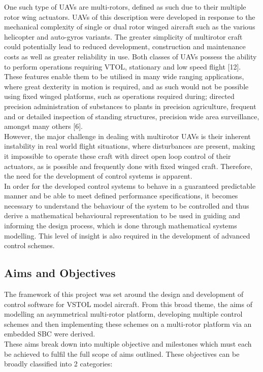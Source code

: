 \documentclass[12pt,a4paper,twoside]{report}
\begin{document}
			One such type of UAVs are multi-rotors, defined as such due to their multiple rotor wing actuators. UAVs of this description were developed in response to the mechanical complexity of single or dual rotor winged aircraft such as the various helicopter and auto-gyros variants. The greater simplicity of multirotor craft could potentially lead to reduced development, construction and maintenance costs as well as greater reliability in use. Both classes of UAVs possess the ability to perform operations requiring VTOL, stationary and low speed flight [12].
			\\
			These features enable them to be utilised in many wide ranging applications, where great dexterity in motion is required, and as such would not be possible using fixed winged platforms, such as operations required during; directed precision administration of substances to plants in precision agriculture, frequent and or detailed inspection of standing structures, precision wide area surveillance, amongst many others [6].
			\\
			However, the major challenge in dealing with multirotor UAVs is their inherent instability in real world flight situations, where disturbances are present, making it impossible to operate these craft with direct open loop control of their actuators, as is possible and frequently done with fixed winged craft. Therefore, the need for the development of control systems is apparent. 
			\\
			In order for the developed control systems to behave in a guaranteed predictable manner and be able to meet defined performance specifications, it becomes necessary to understand the behaviour of the system to be controlled and thus derive a mathematical behavioural representation to be used in guiding and informing the design process, which is done through mathematical systems modelling. This level of insight is also required in the development of advanced control schemes.
		
		
		\subsection{Aims and Objectives}
			
			The framework of this project was set around the design and development of control software for VSTOL model aircraft. From this broad theme, the aims of modelling an asymmetrical multi-rotor platform, developing multiple control schemes and then implementing these schemes on a multi-rotor platform via an embedded SBC were derived.
			\\
			These aims break down into multiple objective and milestones which must each be achieved to fulfil the full scope of aims outlined. These objectives can be broadly classified into 2 categories: 
	
\end{document}
